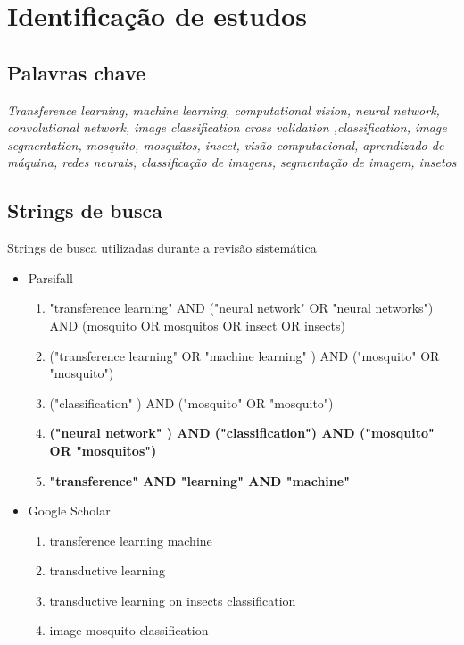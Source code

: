 \documentclass{article}
\begin{document}
\section{Identificação de estudos}
\subsection{Palavras chave}
\emph{Transference learning, machine learning, computational vision,  neural network, convolutional network, image classification cross validation ,classification, image segmentation, mosquito, mosquitos, insect, visão computacional, aprendizado de máquina, redes neurais, classificação de imagens, segmentação de imagem, insetos }

\subsection{Strings de busca}
\label{cap:string_busca}
Strings de busca utilizadas durante a revisão sistemática

\begin{itemize}

    \item Parsifall
    \begin{enumerate}
        \item "transference learning" AND ("neural network" OR "neural networks") AND (mosquito OR mosquitos OR insect OR insects)
        
        \item ("transference learning" OR "machine learning" ) AND ("mosquito" OR "mosquito")
        
        \item ("classification" ) AND ("mosquito" OR "mosquito")
    
        \item \textbf{("neural network" ) AND ("classification") AND ("mosquito" OR "mosquitos")}
    
        \item \textbf{"transference" AND "learning" AND "machine"}
        

    \end{enumerate}

    \item Google Scholar
    \begin{enumerate}
        \item transference learning machine 
    
        \item transductive learning
    
        \item transductive learning on insects classification
        
        \item image mosquito classification
    \end{enumerate}
    
\end{itemize}
\end{document}
